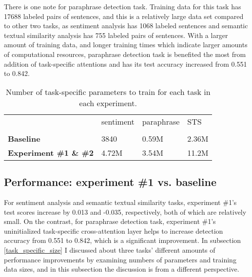 \documentclass{article}
\begin{document}
There is one note for paraphrase detection task. Training data for this task has 17688 labeled pairs of sentences, and this is a relatively large data set compared to other two tasks, as sentiment analysis has 1068 labeled sentences and semantic textual similarity analysis has 755 labeled pairs of sentences. With a larger amount of training data, and longer training times which indicate larger amounts of computational resources, paraphrase detection task is benefited the most from addition of task-specific attentions and has its test accuracy increased from 0.551 to 0.842.

\begin{table}
\begin{center}
\label{parameter_count}
    \hspace*{0cm}\begin{tabular}{| l  | l | l | l |} \hline
                       & sentiment  & paraphrase  & STS      \\
                        &     &      &   \\ \hline\hline

    \textbf{Baseline} &  3840      & 0.59M       & 2.36M   \\  \hline 
     \textbf{Experiment \#1 \& \#2}     & 4.72M    &  3.54M  &  11.2M \\  \hline 
    \end{tabular}\newline
\caption{Number of task-specific parameters to train for each task in each experiment.}
\end{center}
\end{table}




\subsection{Performance: experiment \#1 vs. baseline}
\label{perf_exp1_vs_baseline}
For sentiment analysis and semantic textual similarity tasks, experiment \#1's test scores increase by 0.013 and -0.035, respectively, both of which are relatively small. On the contrast, for paraphrase detection task, experiment \#1's uninitialized task-specific cross-attention layer helps to increase detection accuracy from 0.551 to 0.842, which is a significant improvement. In subsection \ref{task_specific_size} I discussed about three tasks' different amounts of performance improvements by examining numbers of parameters and training data sizes, and in this subsection the discussion is from a different perspective.
\end{document}
